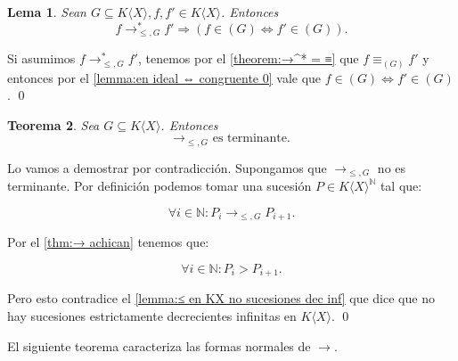 \documentclass[12pt]{report}
\theoremstyle{customstyle}
\newtheorem{theorem}{Teorema}[chapter]
\newtheorem{lemma}[theorem]{Lema}
\renewenvironment{proof}[1][\proofname]{{\noindent \bfseries #1: }}{\qed} %
\theoremstyle{factstyle}
\begin{document}
\begin{lemma}\label{thm:→ mantiene pertenencia a ideal}
  Sean $G ⊆ K⟨X⟩, f, f' ∈ K⟨X⟩$. Entonces
  \[ f →^*_{≤, G} f' ⇒ (f ∈ (G) ⇔ f' ∈ (G)) \text{.}\]
\end{lemma}
\begin{proof}
  Si asumimos $f →^*_{≤, G} f'$, tenemos por el \cref{theorem:→^* = ≡} que $f ≡_{(G)} f'$ y entonces por el \cref{lemma:en ideal ⇔ congruente 0} vale que $f ∈ (G) ⇔ f' ∈ (G)$.
\end{proof}

\begin{theorem}
  Sea $G ⊆ K⟨X⟩$. Entonces
  \[ →_{≤, G} \text{ es terminante.} \]
\end{theorem}
\begin{proof}
  Lo vamos a demostrar por contradicción. Supongamos que $→_{≤, G}$ no es terminante. Por definición podemos tomar una sucesión $P ∈ K⟨X⟩^ℕ$ tal que:

  \[ ∀i ∈ ℕ : P_i →_{≤, G} P_{i+1}. \]

  \noindent Por el \cref{thm:→ achican} tenemos que:

  \[ ∀i ∈ ℕ : P_i > P_{i+1}. \]

  \noindent Pero esto contradice el \cref{lemma:≤ en KX no sucesiones dec inf} que dice que no hay sucesiones estrictamente decrecientes infinitas en $K⟨X⟩$.
\end{proof}

El siguiente teorema caracteriza las formas normales de $→$.
\end{document}
